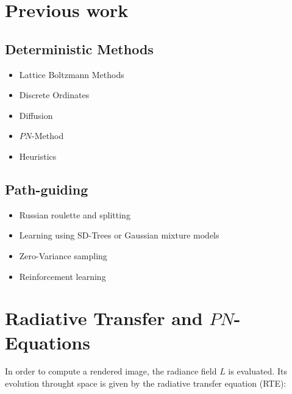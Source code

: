 



\section{Previous work}

\subsection*{Deterministic Methods}

\begin{itemize}
  \item Lattice Boltzmann Methods \cite{Geist04}
  \item Discrete Ordinates
  \item Diffusion \cite{Stam95} \cite{Jakob10} \cite{Koerner14}
  \item $PN$-Method \cite{Kajiya84} 
  \item Heuristics \cite{Kaplanyan10} \cite{Elek14}
\end{itemize}

\subsection*{Path-guiding}

\begin{itemize}
  \item Russian roulette and splitting \cite{Vorba16}
  \item Learning using SD-Trees \cite{Pegoraro08} \cite{Mueller17} or Gaussian mixture models \cite{Vorba14}
  \item Zero-Variance sampling \cite{Krivanek14}
  \item Reinforcement learning \cite{Dahm17}
\end{itemize}




\section{Radiative Transfer and $PN$-Equations}

In order to compute a rendered image, the radiance field $L$ is evaluated. Its evolution throught space is given by the radiative transfer equation (RTE):

